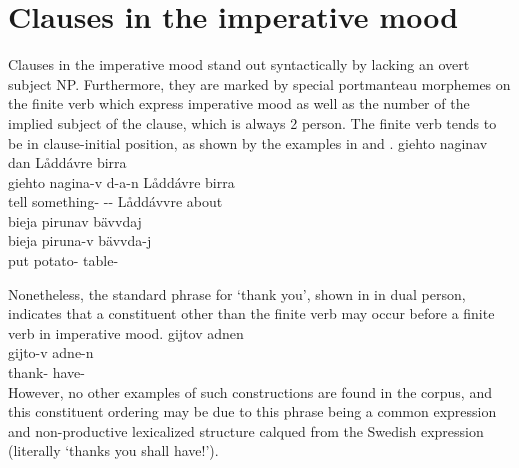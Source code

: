 \section{Clauses in the imperative mood}\label{imperClauses}
Clauses in the imperative mood stand out syntactically by lacking an overt subject NP. Furthermore, they are marked by special portmanteau morphemes %
on the finite verb which express imperative mood as well as the number of the implied subject of the clause, which is always 2 person. 
The finite verb tends to be in clause-initial position, as shown by the examples in  and .
\ea\label{impClause1}%
\glll	giehto naginav dan Låddávre birra\\
	giehto nagina-v d-a-n {Låddávre\footnotemark} birra\\
	tell\BS{} something- -- Låddávvre\BS{} about\\\nopagebreak
{} 
\z
\ea\label{impClause2}%
\glll	bieja pirunav bävvdaj\\
	bieja piruna-v bävvda-j\\
	put\BS{} potato- table-\\\nopagebreak
{} 
\z
{}

Nonetheless, the standard phrase for ‘thank you’, shown in  in dual person, indicates that a constituent other than the finite verb may occur before a finite verb in imperative mood.
\ea\label{impClause3}
\glll	gijtov adnen\\
	gijto-v adne-n\\
	thank- have-\\\nopagebreak
{} 
\z
However, no other examples of such constructions are found in the corpus, and this constituent ordering may be due to this phrase being a common expression and non-productive lexicalized structure calqued from the Swedish expression  (literally ‘thanks you shall have!’). 

